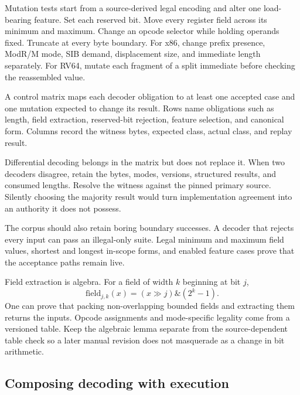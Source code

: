 Mutation tests start from a source-derived legal encoding and alter one
load-bearing feature. Set each reserved bit. Move every register field across
its minimum and maximum. Change an opcode selector while holding operands
fixed. Truncate at every byte boundary. For x86, change prefix presence,
ModR/M mode, SIB demand, displacement size, and immediate length separately.
For RV64, mutate each fragment of a split immediate before checking the
reassembled value.

\begin{definition}[title={A decoder control matrix}]
A control matrix maps each decoder obligation to at least one accepted case
and one mutation expected to change its result. Rows name obligations such as
length, field extraction, reserved-bit rejection, feature selection, and
canonical form. Columns record the witness bytes, expected class, actual class,
and replay result.
\end{definition}

Differential decoding belongs in the matrix but does not replace it. When two
decoders disagree, retain the bytes, modes, versions, structured results, and
consumed lengths. Resolve the witness against the pinned primary source.
Silently choosing the majority result would turn implementation agreement into
an authority it does not possess.

The corpus should also retain boring boundary successes. A decoder that
rejects every input can pass an illegal-only suite. Legal minimum and maximum
field values, shortest and longest in-scope forms, and enabled feature cases
prove that the acceptance paths remain live.

\begin{proofkit}[title={Prove the regular pieces; test the tables}]
Field extraction is algebra. For a field of width \(k\) beginning at bit \(j\),
\[
  \mathrm{field}_{j,k}(x)=(x\mathbin{\gg}j)\mathbin{\&}(2^k-1).
\]
One can prove that packing non-overlapping bounded fields and extracting them
returns the inputs. Opcode assignments and mode-specific legality come from a
versioned table. Keep the algebraic lemma separate from the source-dependent
table check so a later manual revision does not masquerade as a change in bit
arithmetic.
\end{proofkit}

\subsection{Composing decoding with execution}

